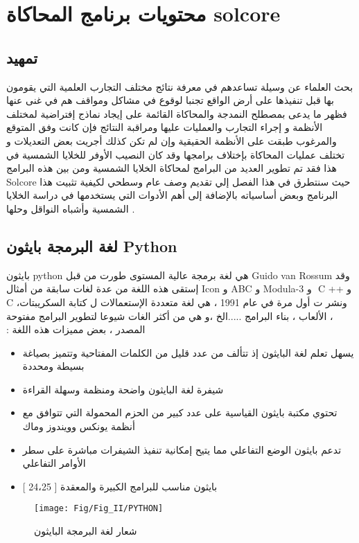 
\chapter{ محتويات برنامج المحاكاة solcore }
\label{Chapter2} 


\section{ تمهيد}
بحث العلماء عن وسيلة تساعدهم في معرفة نتائج مختلف التجارب العلمية التي يقومون بها قبل تنفيذها على أرض الواقع تجنبا لوقوع في مشاكل ومواقف هم في غنى عنها فظهر ما يدعى بمصطلح النمدجة والمحاكاة القائمة على إيجاد نماذج إفتراضية لمختلف الأنظمة و إجراء التجارب والعمليات عليها ومراقبة النتائج فإن كانت  وفق المتوقع والمرغوب طبقت على الأنظمة الحقيقية وإن لم تكن كذلك أجريت بعض التعديلات و تختلف عمليات المحاكاة بإختلاف برامجها وقد كان النصيب الأوفر للخلايا الشمسية في هذا  فقد تم تطوير العديد من البرامج  لمحاكاة الخلايا الشمسية ومن بين هذه البرامج Solcore  حيث سنتطرق في هذا الفصل إلي تقديم وصف عام وسطحي لكيفية تثبيت هذا البرنامج وبعض أساسياته بالإضافة إلى أهم الأدوات التي يستخدمها في دراسة الخلايا الشمسية وأشباه النواقل وحلها .	

\section{لغة البرمجة بايثون Python}
بايثون python هي لغة برمجة عالية  المستوى طورت من قبل Guido van Rossum  وقد إستقى هذه اللغة من عدة لغات سابقة من أمثال  ‫‪Icon‬‬ ‫و‬ ‫‪ABC‬‬ ‫و‬ ‫‪Modula-3‬‬ ‫ و‬ ‫‪C‬‬ ‫‪++‬‬ ‫و‬ ‫‪C‬‬ ،‫  ونشر ت أول مرة في عام  1991 ، هي لغة متعددة الإستعمالات ل كتابة السكريبتات ، الألعاب ، بناء البرامج .....الخ ،و هي من أكثر الغات شيوعا لتطوير البرامج مفتوحة المصدر  ، بعض مميزات هذه اللغة :
\begin{itemize}
	\item   يسهل تعلم لغة البايثون إذ تتألف من عدد قليل من الكلمات المفتاحية وتتميز بصياغة بسيطة ومحددة 
	\item   شيفرة لغة البايثون واضحة ومنظمة وسهلة القراءة 
	\item   تحتوي مكتبة بايثون القياسية على عدد كبير من الحزم المحمولة التي تتوافق مع أنظمة يونكس وويندوز وماك
	\item   تدعم بايثون الوضع التفاعلي مما يتيح إمكانية تنفيذ الشيفرات مباشرة على سطر الأوامر التفاعلي 
	\item   بايثون مناسب للبرامج الكبيرة والمعقدة
	[ 24،25 ]
\end{itemize}
\begin{figure}
	\centering
	\texttt{[image: Fig/Fig\_II/PYTHON]}
	\caption{شعار لغة البرمجة البايثون }
	\label{fig:python}
\end{figure}
\FloatBarrier
